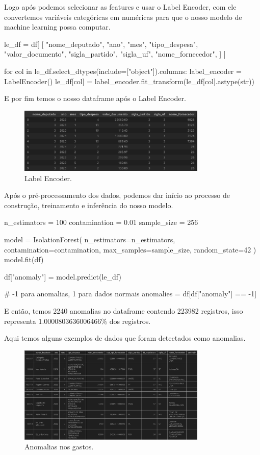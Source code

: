 \documentclass[12pt, a4paper]{article}
\begin{document}
Logo após podemos selecionar as features e usar o Label Encoder, com ele convertemos variáveis categóricas em numéricas para que o nosso modelo de machine learning possa computar.

\begin{python}
le_df = df[
	[
		"nome_deputado",
		"ano",
		"mes",
		"tipo_despesa",
		"valor_documento",
		"sigla_partido",
		"sigla_uf",
		"nome_fornecedor",
	]
]

for col in le_df.select_dtypes(include=["object"]).columns:
	label_encoder = LabelEncoder()
	le_df[col] = label_encoder.fit_transform(le_df[col].astype(str))
\end{python}

E por fim temos o nosso dataframe após o Label Encoder.

\begin{figure}[!htbp]
	\centering
	\includegraphics[width=0.8\textwidth]{assets/3_plot2.png}
	\caption{Label Encoder.}
	\label{fig:label encoder}
\end{figure}
\newpage

Após o pré-processamento dos dados, podemos dar início ao processo de construção, treinamento e inferência do nosso modelo.

\begin{python}
n_estimators = 100
contamination = 0.01
sample_size = 256	

model = IsolationForest(
	n_estimators=n_estimators,
	contamination=contamination,
	max_samples=sample_size,
	random_state=42
)
model.fit(df)

df["anomaly"] = model.predict(le_df)

# -1 para anomalias, 1 para dados normais
anomalies = df[df["anomaly"] == -1]
\end{python}

E então, temos 2240 anomalias no dataframe contendo 223982 registros, isso representa 1.0000803636006466\% dos registros.

Aqui temos alguns exemplos de dados que foram detectados como anomalias.

\begin{figure}[!htbp]
	\centering
	\includegraphics[width=0.8\textwidth]{assets/3_plot3.png}
	\caption{Anomalias nos gastos.}
	\label{fig:anomalias}
\end{figure}
\end{document}
